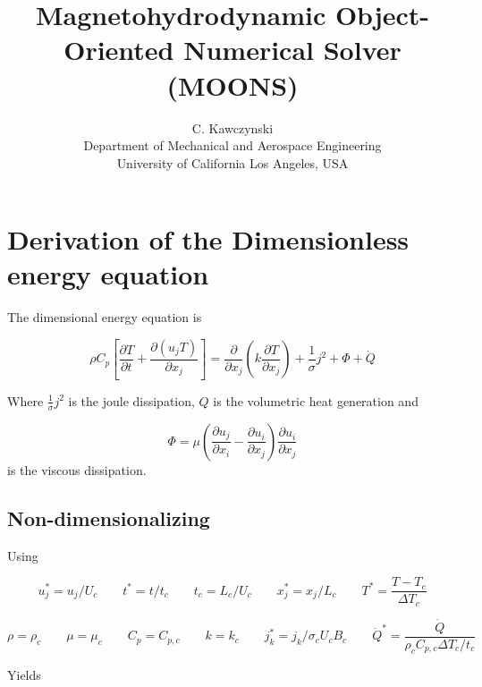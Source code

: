 \documentclass[11pt]{article}
\begin{document}
\doublespacing
\title{Magnetohydrodynamic Object-Oriented Numerical Solver (MOONS)}
\author{C. Kawczynski \\
Department of Mechanical and Aerospace Engineering \\
University of California Los Angeles, USA\\
}
\maketitle

\section{Derivation of the Dimensionless energy equation}
The dimensional energy equation is

\begin{equation}
	\rho C_p
	\left[
	\frac{\partial T}{\partial t} +
	\frac{\partial (u_j T)}{\partial x_j}
	\right]
	= 
	\frac{\partial}{\partial x_j}
	\left( 
	k \frac{\partial T}{\partial x_j}
	\right) + 
	\frac{1}{\sigma} j^2 +
	\Phi +
	\dot{Q}
\end{equation}

Where $\frac{1}{\sigma} j^2$ is the joule dissipation, $Q$ is the volumetric heat generation and

\begin{equation}
	\Phi
	=
	\mu
	\left(
	\frac{\partial u_j}{\partial x_i}
	-
	\frac{\partial u_i}{\partial x_j}
	\right)
	\frac{\partial u_i}{\partial x_j}
\end{equation}
is the viscous dissipation.

\subsection{Non-dimensionalizing}

Using

\begin{equation}
	u_j^* = u_j/U_c \qquad
	t^* = t/t_c \qquad
	t_c = L_c/U_c \qquad
	x_j^* = x_j/L_c \qquad
	T^* = \frac{T - T_c}{\Delta T_c}
\end{equation}

\begin{equation}
	\rho = \rho_c \qquad
	\mu = \mu_c \qquad
	C_p = C_{p,c} \qquad
	k = k_c \qquad
	j_k^* = j_k/ \sigma_c U_c B_c \qquad
	\dot{Q}^* = \frac{\dot{Q}}{\rho_c C_{p,c} \Delta T_c / t_c}
\end{equation}

Yields
\end{document}
